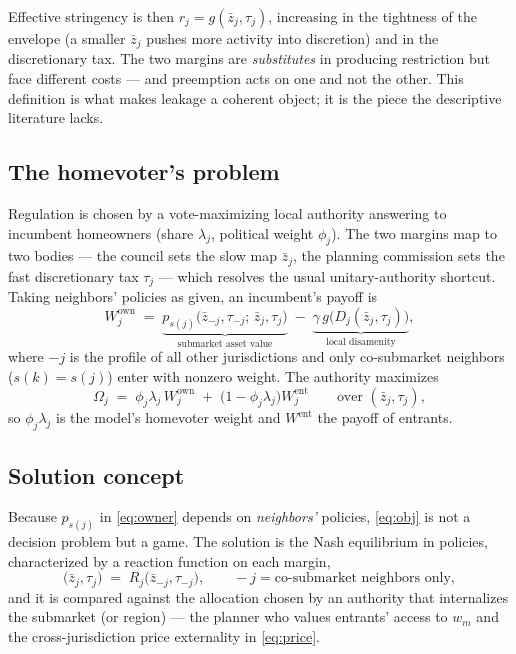 \documentclass[11pt]{article}
\begin{document}
\noindent Effective stringency is then $r_j = g(\bar z_j, \tau_j)$, increasing in the tightness of
the envelope (a smaller $\bar z_j$ pushes more activity into discretion) and in the discretionary
tax. The two margins are \emph{substitutes} in producing restriction but face different costs --- and
preemption acts on one and not the other. This definition is what makes leakage a coherent object;
it is the piece the descriptive literature lacks.

\subsection{The homevoter's problem}

Regulation is chosen by a vote-maximizing local authority answering to incumbent homeowners (share
$\lambda_j$, political weight $\phi_j$). The two margins map to two bodies --- the council sets the
slow map $\bar z_j$, the planning commission sets the fast discretionary tax $\tau_j$ --- which
resolves the usual unitary-authority shortcut. Taking neighbors' policies as given, an incumbent's
payoff is
\begin{equation}
  W^{\text{own}}_j
  \;=\; \underbrace{p_{s(j)}\big(\bar z_{-j}, \tau_{-j};\, \bar z_j, \tau_j\big)}_{\text{submarket asset value}}
  \;-\; \underbrace{\gamma\, g\!\big(D_j(\bar z_j, \tau_j)\big)}_{\text{local disamenity}},
  \label{eq:owner}
\end{equation}
where $-j$ is the profile of all other jurisdictions and only co-submarket neighbors ($s(k) = s(j)$)
enter with nonzero weight. The authority maximizes
\begin{equation}
  \Omega_j \;=\; \phi_j \lambda_j\, W^{\text{own}}_j \;+\; \big(1 - \phi_j \lambda_j\big) W^{\text{ent}}_j
  \qquad \text{over } (\bar z_j, \tau_j),
  \label{eq:obj}
\end{equation}
so $\phi_j \lambda_j$ is the model's homevoter weight and $W^{\text{ent}}$ the payoff of entrants.

\subsection{Solution concept}

Because $p_{s(j)}$ in \eqref{eq:owner} depends on \emph{neighbors'} policies, \eqref{eq:obj} is not a
decision problem but a game. The solution is the Nash equilibrium in policies, characterized by a
reaction function on each margin,
\[
  \big(\bar z_j, \tau_j\big) \;=\; R_j\big(\bar z_{-j}, \tau_{-j}\big),
  \qquad -j = \text{co-submarket neighbors only},
\]
and it is compared against the allocation chosen by an authority that internalizes the submarket (or
region) --- the planner who values entrants' access to $w_m$ and the cross-jurisdiction price
externality in \eqref{eq:price}.
\end{document}
